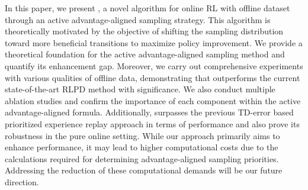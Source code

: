 In this paper, we present \algname, a novel algorithm for online RL with offline dataset through an active advantage-aligned sampling strategy. This algorithm is theoretically motivated by the objective of shifting the sampling distribution toward more beneficial transitions to maximize policy improvement. We provide a theoretical foundation for the active advantage-aligned sampling method and quantify its enhancement gap.
Moreover, we carry out comprehensive experiments with various qualities of offline data, demonstrating that \algname outperforms the current state-of-the-art RLPD method with significance. We also conduct multiple ablation studies and confirm the importance of each component within the active advantage-aligned formula. Additionally, \algname surpasses the previous TD-error based prioritized experience replay approach in terms of performance and also prove its robustness in the pure online setting.
While our approach primarily aims to enhance performance, it may lead to higher computational costs due to the calculations required for determining advantage-aligned sampling priorities. Addressing the reduction of these computational demands will be our future direction.



